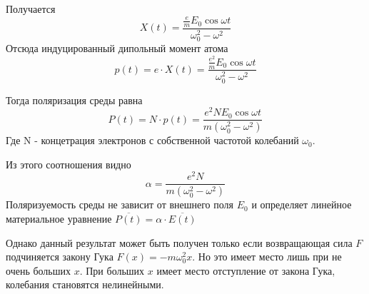 \documentclass[12pt,a5paper,titlepage, main = russian]{article}
\begin{document}
Получается
\begin{equation}
X(t) = \frac{\frac{e}{m} E_0 \cos \omega t}{\omega^2_0 - \omega^2}
\end{equation}
Отсюда индуцированный дипольный момент атома
\begin{equation}
p(t) = e \cdot X(t) = \frac{\frac{e^2}{m} E_0 \cos \omega t}{\omega^2_0 - \omega^2}
\end{equation}

Тогда поляризация среды равна
\begin{equation}
P(t) = N \cdot p(t) = \frac{e^2 N E_0 \cos \omega t}{m(\omega^2_0 - \omega^2)}
\end{equation}
Где N - концетрация электронов с собственной частотой колебаний $\omega_0$.

Из этого соотношения видно
\begin{equation}
\alpha = \frac{e^2 N}{m(\omega^2_0 - \omega^2)}
\end{equation}
Поляризуемость среды не зависит от внешнего поля $E_0$ и определяет линейное материальное уравнение $\overline{P(t)} = \alpha \cdot \overline{E(t)}$

Однако данный результат может быть получен только если возвращающая сила $F$ подчиняется закону Гука $F(x) = -m \omega^2_0 x$. Но это имеет место лишь при не очень больших $x$. При больших $x$ имеет место отступление от закона Гука, колебания становятся нелинейными.
\end{document}
